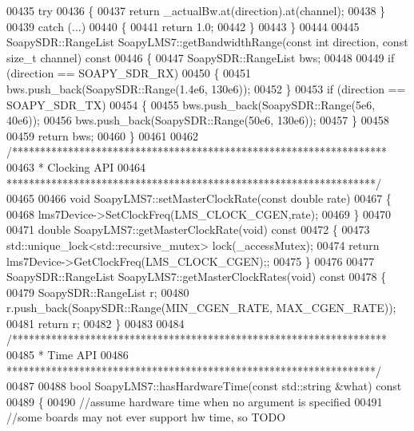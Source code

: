 \begin{DoxyCode}
{{{{{{{{{{{{{{00435     \textcolor{keywordflow}{try}
00436     \{
00437         \textcolor{keywordflow}{return} _actualBw.at(direction).at(channel);
00438     \}
00439     \textcolor{keywordflow}{catch} (...)
00440     \{
00441         \textcolor{keywordflow}{return} 1.0;
00442     \}
00443 \}
00444 
00445 SoapySDR::RangeList SoapyLMS7::getBandwidthRange(\textcolor{keyword}{const} \textcolor{keywordtype}{int} direction, \textcolor{keyword}{const} \textcolor{keywordtype}{size\_t} channel)\textcolor{keyword}{ const}
00446 \textcolor{keyword}{}\{
00447     SoapySDR::RangeList bws;
00448 
00449     \textcolor{keywordflow}{if} (direction == SOAPY\_SDR\_RX)
00450     \{
00451         bws.push\_back(SoapySDR::Range(1.4e6, 130e6));
00452     \}
00453     \textcolor{keywordflow}{if} (direction == SOAPY\_SDR\_TX)
00454     \{
00455         bws.push\_back(SoapySDR::Range(5e6, 40e6));
00456         bws.push\_back(SoapySDR::Range(50e6, 130e6));
00457     \}
00458 
00459     \textcolor{keywordflow}{return} bws;
00460 \}
00461 
00462 \textcolor{comment}{/*******************************************************************}
00463 \textcolor{comment}{ * Clocking API}
00464 \textcolor{comment}{ ******************************************************************/}
00465 
00466 \textcolor{keywordtype}{void} SoapyLMS7::setMasterClockRate(\textcolor{keyword}{const} \textcolor{keywordtype}{double} rate)
00467 \{
00468     lms7Device->SetClockFreq(LMS_CLOCK_CGEN,rate);
00469 \}
00470 
00471 \textcolor{keywordtype}{double} SoapyLMS7::getMasterClockRate(\textcolor{keywordtype}{void})\textcolor{keyword}{ const}
00472 \textcolor{keyword}{}\{
00473     std::unique\_lock<std::recursive\_mutex> lock(_accessMutex);
00474     \textcolor{keywordflow}{return} lms7Device->GetClockFreq(LMS_CLOCK_CGEN);;
00475 \}
00476 
00477 SoapySDR::RangeList SoapyLMS7::getMasterClockRates(\textcolor{keywordtype}{void})\textcolor{keyword}{ const}
00478 \textcolor{keyword}{}\{
00479     SoapySDR::RangeList r;
00480     r.push\_back(SoapySDR::Range(MIN_CGEN_RATE, MAX_CGEN_RATE));
00481     \textcolor{keywordflow}{return} r;
00482 \}
00483 
00484 \textcolor{comment}{/*******************************************************************}
00485 \textcolor{comment}{ * Time API}
00486 \textcolor{comment}{ ******************************************************************/}
00487 
00488 \textcolor{keywordtype}{bool} SoapyLMS7::hasHardwareTime(\textcolor{keyword}{const} std::string &what)\textcolor{keyword}{ const}
00489 \textcolor{keyword}{}\{
00490     \textcolor{comment}{//assume hardware time when no argument is specified}
00491     \textcolor{comment}{//some boards may not ever support hw time, so TODO}
}}}}}}}}}}}}}}
\end{DoxyCode}
